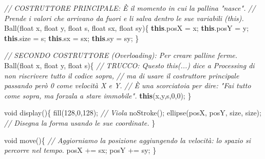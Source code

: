 \documentclass[
]{article}
\newenvironment{Shaded}{}{}
\newcommand{\CommentTok}[1]{\textcolor[rgb]{0.38,0.63,0.69}{\textit{#1}}}
\newcommand{\DataTypeTok}[1]{\textcolor[rgb]{0.56,0.13,0.00}{#1}}
\newcommand{\DecValTok}[1]{\textcolor[rgb]{0.25,0.63,0.44}{#1}}
\newcommand{\FunctionTok}[1]{\textcolor[rgb]{0.02,0.16,0.49}{#1}}
\newcommand{\KeywordTok}[1]{\textcolor[rgb]{0.00,0.44,0.13}{\textbf{#1}}}
\newcommand{\NormalTok}[1]{#1}
\newcommand{\OperatorTok}[1]{\textcolor[rgb]{0.40,0.40,0.40}{#1}}
\begin{document}
\begin{Shaded}
\begin{Highlighting}[]
  \CommentTok{// COSTRUTTORE PRINCIPALE: È il momento in cui la pallina "nasce".}
  \CommentTok{// Prende i valori che arrivano da fuori e li salva dentro le sue variabili (this).}
  \FunctionTok{Ball}\OperatorTok{(}\DataTypeTok{float}\NormalTok{ x}\OperatorTok{,} \DataTypeTok{float}\NormalTok{ y}\OperatorTok{,} \DataTypeTok{float}\NormalTok{ s}\OperatorTok{,} \DataTypeTok{float}\NormalTok{ sx}\OperatorTok{,} \DataTypeTok{float}\NormalTok{ sy}\OperatorTok{)\{} 
    \KeywordTok{this}\OperatorTok{.}\FunctionTok{posX} \OperatorTok{=}\NormalTok{ x}\OperatorTok{;} 
    \KeywordTok{this}\OperatorTok{.}\FunctionTok{posY} \OperatorTok{=}\NormalTok{ y}\OperatorTok{;}
    \KeywordTok{this}\OperatorTok{.}\FunctionTok{size} \OperatorTok{=}\NormalTok{ s}\OperatorTok{;}
    \KeywordTok{this}\OperatorTok{.}\FunctionTok{sx} \OperatorTok{=}\NormalTok{ sx}\OperatorTok{;}
    \KeywordTok{this}\OperatorTok{.}\FunctionTok{sy} \OperatorTok{=}\NormalTok{ sy}\OperatorTok{;}
  \OperatorTok{\}}
  
  \CommentTok{// SECONDO COSTRUTTORE (Overloading): Per creare palline ferme.}
  \FunctionTok{Ball}\OperatorTok{(}\DataTypeTok{float}\NormalTok{ x}\OperatorTok{,} \DataTypeTok{float}\NormalTok{ y}\OperatorTok{,} \DataTypeTok{float}\NormalTok{ s}\OperatorTok{)\{} 
    \CommentTok{// TRUCCO: Questo \textquotesingle{}this(...)\textquotesingle{} dice a Processing di non riscrivere tutto il codice sopra,}
    \CommentTok{// ma di usare il costruttore principale passando però 0 come velocità X e Y.}
    \CommentTok{// È una scorciatoia per dire: "Fai tutto come sopra, ma forzala a stare immobile".}
    \KeywordTok{this}\OperatorTok{(}\NormalTok{x}\OperatorTok{,}\NormalTok{y}\OperatorTok{,}\NormalTok{s}\OperatorTok{,}\DecValTok{0}\OperatorTok{,}\DecValTok{0}\OperatorTok{);} 
  \OperatorTok{\}}
  
  \DataTypeTok{void} \FunctionTok{display}\OperatorTok{()\{} 
    \FunctionTok{fill}\OperatorTok{(}\DecValTok{128}\OperatorTok{,}\DecValTok{0}\OperatorTok{,}\DecValTok{128}\OperatorTok{);} \CommentTok{// Viola}
    \FunctionTok{noStroke}\OperatorTok{();} 
    \FunctionTok{ellipse}\OperatorTok{(}\NormalTok{posX}\OperatorTok{,}\NormalTok{ posY}\OperatorTok{,}\NormalTok{ size}\OperatorTok{,}\NormalTok{ size}\OperatorTok{);} \CommentTok{// Disegna la forma usando le sue coordinate.}
  \OperatorTok{\}}
  
  \DataTypeTok{void} \FunctionTok{move}\OperatorTok{()\{} 
    \CommentTok{// Aggiorniamo la posizione aggiungendo la velocità: lo spazio si percorre nel tempo.}
\NormalTok{    posX }\OperatorTok{+=}\NormalTok{ sx}\OperatorTok{;}
\NormalTok{    posY }\OperatorTok{+=}\NormalTok{ sy}\OperatorTok{;}
  \OperatorTok{\}}
  

\end{Highlighting}
\end{Shaded}
\end{document}
